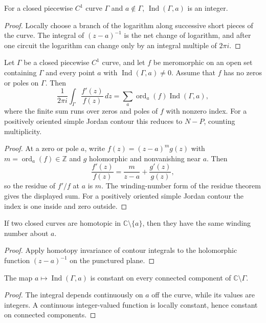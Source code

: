 \begin{theorem}\label{thm:iv12-01}
For a closed piecewise $C^1$ curve $\Gamma$ and $a\notin\Gamma$, $\operatorname{Ind}(\Gamma,a)$ is an integer.
\begin{proof}
Locally choose a branch of the logarithm along successive short pieces of the curve. The integral of $(z-a)^{-1}$ is the net change of logarithm, and after one circuit the logarithm can change only by an integral multiple of $2\pi i$.
\end{proof}
\end{theorem}

\begin{theorem}\label{thm:iv12-02}
Let $\Gamma$ be a closed piecewise $C^1$ curve, and let $f$ be meromorphic on an open set containing $\Gamma$ and every point $a$ with $\operatorname{Ind}(\Gamma,a)\ne0$. Assume that $f$ has no zeros or poles on $\Gamma$. Then
\[
\frac{1}{2\pi i}\int_\Gamma \frac{f'(z)}{f(z)}\,dz
=
\sum_a \operatorname{ord}_a(f)\operatorname{Ind}(\Gamma,a),
\]
where the finite sum runs over zeros and poles of $f$ with nonzero index. For a positively oriented simple Jordan contour this reduces to $N-P$, counting multiplicity.
\begin{proof}
At a zero or pole $a$, write $f(z)=(z-a)^m g(z)$ with $m=\operatorname{ord}_a(f)\in\mathbb Z$ and $g$ holomorphic and nonvanishing near $a$. Then
\[
\frac{f'(z)}{f(z)}=\frac{m}{z-a}+\frac{g'(z)}{g(z)},
\]
so the residue of $f'/f$ at $a$ is $m$. The winding-number form of the residue theorem gives the displayed sum. For a positively oriented simple Jordan contour the index is one inside and zero outside.
\end{proof}
\end{theorem}

\begin{theorem}\label{thm:iv12-03}
If two closed curves are homotopic in $\mathbb C\setminus\{a\}$, then they have the same winding number about $a$.
\begin{proof}
Apply homotopy invariance of contour integrals to the holomorphic function $(z-a)^{-1}$ on the punctured plane.
\end{proof}
\end{theorem}

\begin{theorem}\label{thm:iv12-04}
The map $a\mapsto\operatorname{Ind}(\Gamma,a)$ is constant on every connected component of $\mathbb C\setminus\Gamma$.
\begin{proof}
The integral depends continuously on $a$ off the curve, while its values are integers. A continuous integer-valued function is locally constant, hence constant on connected components.
\end{proof}
\end{theorem}

